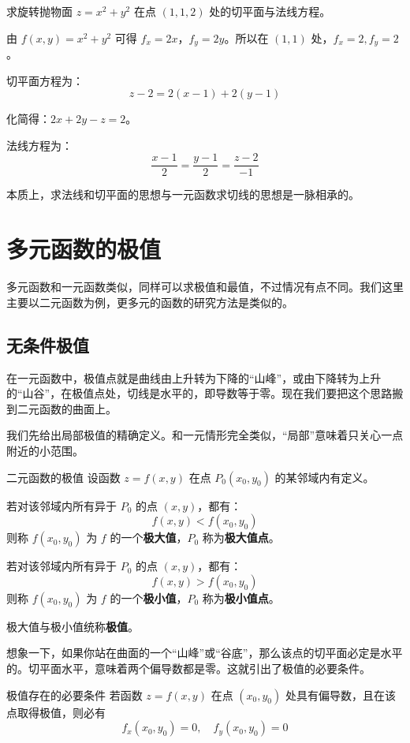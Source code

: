 \begin{myexample}
求旋转抛物面 $z = x^2 + y^2$ 在点 $(1,1,2)$ 处的切平面与法线方程。

由 $f(x,y) = x^2+y^2$ 可得 $f_x = 2x$，$f_y = 2y$。所以在 $(1,1)$ 处，$f_x=2, f_y=2$。

切平面方程为：
\[
z-2 = 2(x-1) + 2(y-1)
\]

化简得：$2x + 2y - z = 2$。

法线方程为：
\[
\frac{x-1}{2} = \frac{y-1}{2} = \frac{z-2}{-1}
\]
\end{myexample}

本质上，求法线和切平面的思想与一元函数求切线的思想是一脉相承的。

\section{多元函数的极值}
多元函数和一元函数类似，同样可以求极值和最值，不过情况有点不同。我们这里主要以二元函数为例，更多元的函数的研究方法是类似的。

\subsection{无条件极值}

在一元函数中，极值点就是曲线由上升转为下降的“山峰”，或由下降转为上升的“山谷”，在极值点处，切线是水平的，即导数等于零。现在我们要把这个思路搬到二元函数的曲面上。

我们先给出局部极值的精确定义。和一元情形完全类似，“局部”意味着只关心一点附近的小范围。

\begin{definition}{二元函数的极值}{}
设函数 $z = f(x, y)$ 在点 $P_0(x_0, y_0)$ 的某邻域内有定义。

若对该邻域内所有异于 $P_0$ 的点 $(x, y)$，都有：
\[
f(x, y) < f(x_0, y_0)
\]
则称 $f(x_0, y_0)$ 为 $f$ 的一个\textbf{极大值}，$P_0$ 称为\textbf{极大值点}。

若对该邻域内所有异于 $P_0$ 的点 $(x, y)$，都有：
\[
f(x, y) > f(x_0, y_0)
\]
则称 $f(x_0, y_0)$ 为 $f$ 的一个\textbf{极小值}，$P_0$ 称为\textbf{极小值点}。

极大值与极小值统称\textbf{极值}。
\end{definition}

想象一下，如果你站在曲面的一个“山峰”或“谷底”，那么该点的切平面必定是水平的。切平面水平，意味着两个偏导数都是零。这就引出了极值的必要条件。

\begin{theorem}{极值存在的必要条件}{}
若函数 $z = f(x, y)$ 在点 $(x_0, y_0)$ 处具有偏导数，且在该点取得极值，则必有
\[
f_x(x_0, y_0) = 0,\quad f_y(x_0, y_0) = 0
\]
\end{theorem}

